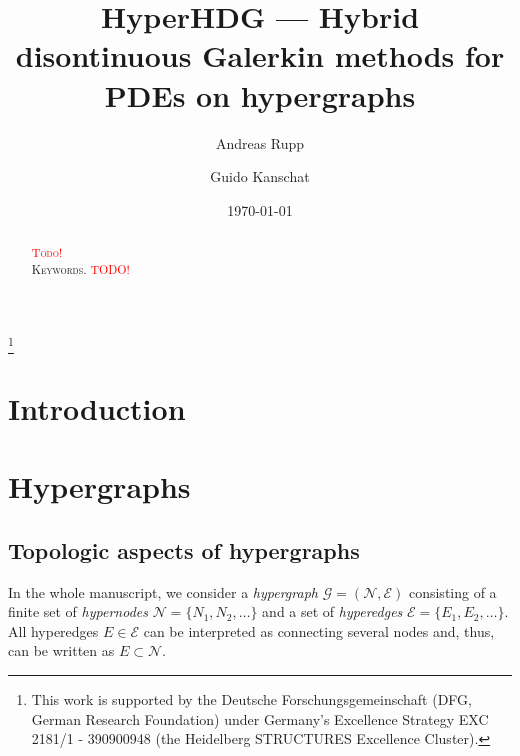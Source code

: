 \documentclass[a4paper, english, 12pt, reqno, draft]{amsart}
\theoremstyle{definition}
\theoremstyle{remark}
\numberwithin{equation}{section}
\newcommand{\graph}{\ensuremath{\mathcal G}}
\newcommand{\setEdge}{\ensuremath{\mathcal E}}
\newcommand{\setNode}{\ensuremath{\mathcal N}}
\newcommand{\edge}{\ensuremath{E}}
\newcommand{\node}{\ensuremath{N}}
\begin{document}
\title{H\MakeLowercase{yper}HDG --- Hybrid disontinuous Galerkin methods for PDEs on hypergraphs} 

\author{Andreas Rupp}
\address{Interdisciplinary Center for Scientific Computing (IWR), Heidelberg University, Mathematikon, Im Neuenheimer Feld 205, 69120 Heidelberg, Germany}
\thanks{This work is supported by the Deutsche Forschungsgemeinschaft (DFG, German Research Foundation) under Germany's Excellence Strategy EXC 2181/1 - 390900948 (the Heidelberg STRUCTURES Excellence Cluster).}

\author{Guido Kanschat}
\address{Interdisciplinary Center for Scientific Computing (IWR) and Mathematics Center Heidelberg (MATCH), Heidelberg University, Mathematikon, Im Neuenheimer Feld 205, 69120 Heidelberg, Germany}

\subjclass[2010]{\textcolor{red}{TODO}}

\date{\today}


\begin{abstract}
 \textcolor{red}{\textsc{Todo!}} 
 \\[1ex] \noindent \textsc{Keywords.}
 \textcolor{red}{TODO!}
\end{abstract}
% 
\maketitle
% 
\section{Introduction}
% 
\section{Hypergraphs}\label{SEC:hypergraph}
% 
\subsection{Topologic aspects of hypergraphs}
% 
In the whole manuscript, we consider a \emph{hypergraph} $\graph = (\setNode,\setEdge)$ consisting of a finite set of \emph{hypernodes} $\setNode = \{\node_1, \node_2, \ldots \}$ and a set of \emph{hyperedges} $\setEdge = \{\edge_1, \edge_2, \ldots \}$. All hyperedges $\edge \in \setEdge$ can be interpreted as connecting several nodes and, thus, can be written as $\edge \subset \setNode$.
\end{document}

